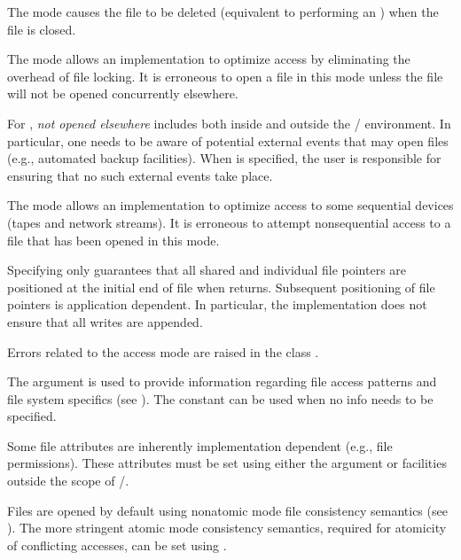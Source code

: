 The  mode causes the file to be deleted
(equivalent to performing an )
when the file is closed.

The  mode allows an implementation to
optimize access by eliminating the overhead of file locking.
It is erroneous to open a file in this mode unless the file will
not be opened concurrently elsewhere.

\begin{users}
For , \emph{not opened elsewhere} includes
both inside and outside the \MPI/ environment.
In particular, one needs to be aware of potential external events
that may open files (e.g., automated backup facilities).
When  is specified,
the user is responsible for ensuring that no such external events take place.
\end{users}

The  mode allows an implementation to
optimize access to some sequential devices (tapes and network streams).
It is erroneous to attempt nonsequential access to a
file that has been opened in this mode.

Specifying  only guarantees that all shared and individual
file pointers are positioned at the initial end of file when 
returns.
Subsequent positioning of file pointers is application dependent.
In particular, the implementation does not ensure that all writes are
appended.

Errors related to the access mode are raised
in the class .

The  argument is used to provide information
regarding file access patterns and file system specifics
(see ).
The constant 
can be used when no info needs to be specified.
\begin{users}
Some file attributes are inherently implementation dependent
(e.g., file permissions).
These attributes must be set using either
the  argument or facilities outside the scope of \MPI/.
\end{users}

Files are opened by default using nonatomic mode file consistency semantics
(see ).
The more stringent atomic mode consistency semantics,
required for atomicity of conflicting accesses,
can be set using .

